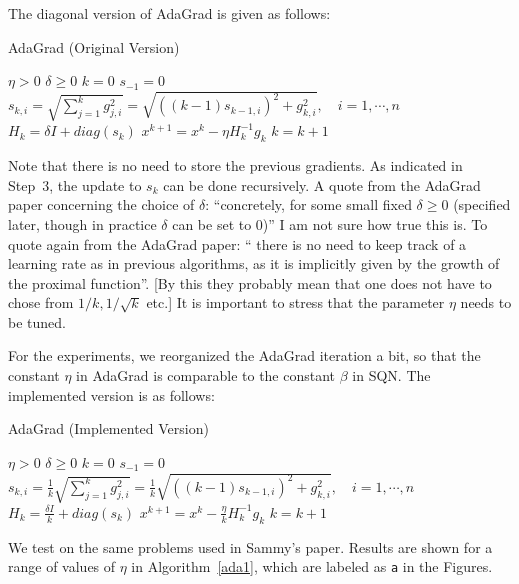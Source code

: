 \documentclass[12pt]{article}
\begin{document}
The diagonal version of AdaGrad is given as follows:

\begin{algorithm}[H]
\caption{AdaGrad (Original Version)}
\label{ada1}
\begin{algorithmic}[1]
\REQUIRE  $\eta>0$ $\delta \geq 0$
\STATE  $k=0$ $s_{-1}=0$
\STATE $s_{k,i} =\sqrt{   \sum_{j=1}^k g_{j,i}^2   }  =\sqrt{ ((k-1) s_{k-1,i})^2 +g_{k,i}^2 }, \quad i=1, \cdots, n  $
\STATE $H_k =\delta I + diag(s_k)$
\STATE $x^{k+1} = x^k - \eta H_k^{-1} g_k$
\STATE $k=k+1$
\ENDWHILE
\end{algorithmic}
\end{algorithm}

Note that there is no need to store the previous gradients. As indicated in Step~3, the update to $s_k$ can be done recursively. A quote from the AdaGrad paper concerning the choice of $\delta$: ``concretely, for some small fixed $\delta \geq 0$  (specified later, though in practice $\delta$ can be set to 0)'' I am not sure how true this is. To quote again from the AdaGrad paper: `` there is no need to keep track of a learning rate as in previous algorithms, as it is implicitly given by the growth of the proximal function''. [By this they probably mean that one does not have to chose from $1/k, 1/\sqrt{k}$ etc.] It is important to stress that the parameter $\eta$ needs to be tuned.

For the experiments, we reorganized the AdaGrad iteration a bit, so that the constant $\eta$ in AdaGrad is comparable to the constant $\beta$ in SQN. The implemented version is as follows:



\bigskip
\begin{algorithm}[H]
\caption{AdaGrad (Implemented Version)}
\label{ada2}
\begin{algorithmic}[1]
\REQUIRE  $\eta>0$ $\delta \geq 0$
\STATE  $k=0$ $s_{-1}=0$
\STATE $s_{k,i} = \frac{1}{k} \sqrt{   \sum_{j=1}^k g_{j,i}^2   }  =\frac{1}{k} \sqrt{ ((k-1) s_{k-1,i})^2 +g_{k,i}^2 }, \quad i=1, \cdots, n  $
\STATE $H_k= \frac{\delta I}{k} + diag(s_k)$
\STATE $x^{k+1} = x^k - \frac{\eta}{k} H_k^{-1} g_k$
\STATE $k=k+1$
\ENDWHILE
\end{algorithmic}
\end{algorithm}


We test on the same problems used in Sammy's paper. Results are shown for a range of values of $\eta$ in Algorithm~\ref{ada1}, which are labeled as {\tt a} in the Figures.
\end{document}
